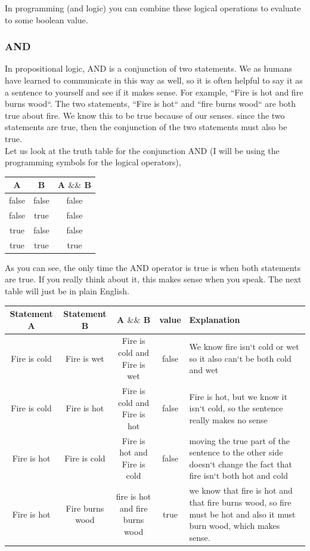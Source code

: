 \documentclass[11]{article}
\begin{document}
In programming (and logic) you can combine these logical operations to evaluate to some boolean value.\\

\subsubsection{AND}
In propositional logic, AND is a conjunction of two statements. We as humans have learned to communicate in this way as well, so it is often helpful to say it as a sentence to yourself and see if it makes sense. For example, ``Fire is hot and fire burns wood``. The two statements, ``Fire is hot`` and ``fire burns wood`` are both true about fire. We know this to be true because of our senses. since the two statements are true, then the conjunction of the two statements must also be true.\\

Let us look at the truth table for the conjunction AND (I will be using the programming symbols for the logical operators),
\begin{center}
  \begin{tabular}{ | c | c | c |}
    \hline
    A & B & A $\&\&$ B \\ \hline
    false & false & false \\ \hline
    false & true & false \\ \hline
    true & false & false \\ \hline
    true & true & true \\
    \hline
  \end{tabular}
\end{center}

As you can see, the only time the AND operator is true is when both statements are true. If you really think about it, this makes sense when you speak. The next table will just be in plain English.

\begin{center}
  \begin{tabular}{ | c | c | c | c | p{4.5cm} |}
    \hline
		Statement A & Statement B & A $\&\&$ B & value & Explanation \\ \hline
		Fire is cold & Fire is wet & Fire is cold and Fire is wet & false & We know fire isn`t cold or wet so it also can`t be both cold and wet \\  \hline
		
		Fire is cold & Fire is hot & Fire is cold and Fire is hot & false & Fire is hot, but we know it isn`t cold, so the sentence really makes no sense \\ \hline
		
		Fire is hot & Fire is cold & Fire is hot and Fire is cold & false & moving the true part of the sentence to the other side doesn`t change the fact that fire isn`t both hot and cold \\ \hline
		
		Fire is hot & Fire burns wood & fire is hot and fire burns wood & true & we know that fire is hot and that fire burns wood, so fire must be hot and also it must burn wood, which makes sense. \\
    \hline
  \end{tabular}
\end{center}
\end{document}
